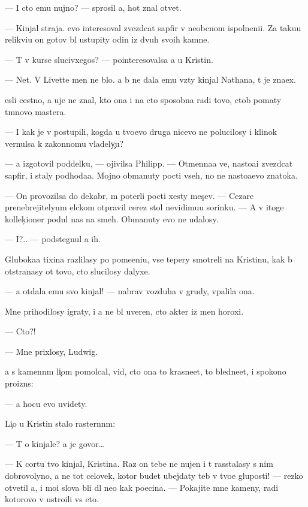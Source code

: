 \documentclass[10pt]{book}
\begin{document}
— I cto {\y}emu nujno? — sprosil {\y}a, hot{\ia} znal otvet.

— Kinjal straja. {\Y}evo interesoval zvezdcat{\yi}{\y} sapfir v neob{\yi}cnom ispolneni{\y}i. Za taku{\y}u relikvi{\y}u on gotov b{\yi}l ustupity odin iz dvuh svo{\y}ih kamne{\y}.

— T{\yi} v kurse slucivxegos{\ia}? — pointeresovalsa {\y}a u Kristin{\yi}.

— Net. V Livette men{\ia} ne b{\yi}lo. {\Y}a b{\yi} ne dala {\y}emu vz{\ia}ty kinjal Nathana, t{\yi} je zna{\y}ex.

{\Y}esli cestno, {\y}a uje ne znal, kto ona i na cto sposobna radi tovo, ctob{\yi} po{\y}maty t{\e}mnovo mastera.

— I kak je v{\yi} postupili, kogda u tvo{\y}evo druga nicevo ne polucilosy i klinok vernulsa k zakonnomu vladely{\c}u?

— {\Y}a izgotovil poddelku, — ojivilsa Philipp. — Otmenna{\y}a ve{\x}, nasto{\y}a{\x}i{\y} zvezdcat{\yi}{\y} sapfir, i staly podhod{\ia}{\x}a{\y}a. Mojno obmanuty pocti vseh, no ne nasto{\y}a{\x}evo znatoka.

— On provozilsa do dekabr{\ia}, m{\yi} poter{\ia}li pocti xesty mes{\ia}{\c}ev. — Cezare prenebrejitelyn{\yi}m {\x}elckom otpravil cerez stol nevidimu{\y}u sorinku. — A v itoge kollek{\c}ioner podn{\ia}l nas na smeh. Obmanuty {\y}evo ne udalosy.

— I?.. — podstegnul {\y}a ih.

Gluboka{\y}a tixina razlilasy po pome{\x}eni{\y}u, vse tepery smotreli na Kristinu, kak b{\yi} otstran{\ia}{\y}asy ot tovo, cto slucilosy dalyxe.

— {\Y}a otdala {\y}emu svo{\y} kinjal! — nabrav vozduha v grudy, v{\yi}palila ona.

Mne prihodilosy igraty, i {\y}a ne b{\yi}l uveren, cto akter iz men{\ia} horoxi{\y}.

— Cto?!

— Mne prixlosy, Ludwig.

{\Y}a s kamenn{\yi}m li{\c}om pomolcal, vid{\ia}, cto ona to krasne{\y}et, to bledne{\y}et, i spoko{\y}no proizn{\e}s:

— {\Y}a hocu {\y}evo uvidety.

Li{\c}o u Kristin{\yi} stalo raster{\ia}nn{\yi}m:

— T{\yi} o kinjale? {\Y}a je govor{\iu}…

— K cortu tvo{\y} kinjal, Kristina. Raz on tebe ne nujen i t{\yi} rasstalasy s nim dobrovolyno, {\y}a ne tot celovek, kotor{\yi}{\y} budet ubejdaty teb{\ia} v tvo{\y}e{\y} gluposti! — rezko otvetil {\y}a, i mo{\y}i slova b{\yi}li dl{\ia} ne{\y}o kak po{\x}ecina. — Pokajite mne kameny, radi kotorovo v{\yi} ustro{\y}ili vs{\e} eto.
\end{document}
